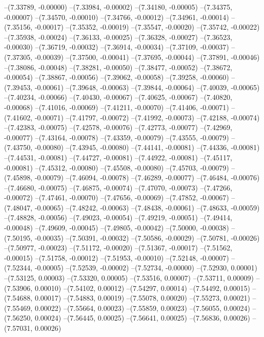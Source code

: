 --(7.33789, -0.00000)
--(7.33984, -0.00002)
--(7.34180, -0.00005)
--(7.34375, -0.00007)
--(7.34570, -0.00010)
--(7.34766, -0.00012)
--(7.34961, -0.00014)
--(7.35156, -0.00017)
--(7.35352, -0.00019)
--(7.35547, -0.00020)
--(7.35742, -0.00022)
--(7.35938, -0.00024)
--(7.36133, -0.00025)
--(7.36328, -0.00027)
--(7.36523, -0.00030)
--(7.36719, -0.00032)
--(7.36914, -0.00034)
--(7.37109, -0.00037)
--(7.37305, -0.00039)
--(7.37500, -0.00041)
--(7.37695, -0.00044)
--(7.37891, -0.00046)
--(7.38086, -0.00048)
--(7.38281, -0.00050)
--(7.38477, -0.00052)
--(7.38672, -0.00054)
--(7.38867, -0.00056)
--(7.39062, -0.00058)
--(7.39258, -0.00060)
--(7.39453, -0.00061)
--(7.39648, -0.00063)
--(7.39844, -0.00064)
--(7.40039, -0.00065)
--(7.40234, -0.00066)
--(7.40430, -0.00067)
--(7.40625, -0.00067)
--(7.40820, -0.00068)
--(7.41016, -0.00069)
--(7.41211, -0.00070)
--(7.41406, -0.00071)
--(7.41602, -0.00071)
--(7.41797, -0.00072)
--(7.41992, -0.00073)
--(7.42188, -0.00074)
--(7.42383, -0.00075)
--(7.42578, -0.00076)
--(7.42773, -0.00077)
--(7.42969, -0.00077)
--(7.43164, -0.00078)
--(7.43359, -0.00079)
--(7.43555, -0.00079)
--(7.43750, -0.00080)
--(7.43945, -0.00080)
--(7.44141, -0.00081)
--(7.44336, -0.00081)
--(7.44531, -0.00081)
--(7.44727, -0.00081)
--(7.44922, -0.00081)
--(7.45117, -0.00081)
--(7.45312, -0.00080)
--(7.45508, -0.00080)
--(7.45703, -0.00079)
--(7.45898, -0.00079)
--(7.46094, -0.00078)
--(7.46289, -0.00077)
--(7.46484, -0.00076)
--(7.46680, -0.00075)
--(7.46875, -0.00074)
--(7.47070, -0.00073)
--(7.47266, -0.00072)
--(7.47461, -0.00070)
--(7.47656, -0.00069)
--(7.47852, -0.00067)
--(7.48047, -0.00065)
--(7.48242, -0.00063)
--(7.48438, -0.00061)
--(7.48633, -0.00059)
--(7.48828, -0.00056)
--(7.49023, -0.00054)
--(7.49219, -0.00051)
--(7.49414, -0.00048)
--(7.49609, -0.00045)
--(7.49805, -0.00042)
--(7.50000, -0.00038)
--(7.50195, -0.00035)
--(7.50391, -0.00032)
--(7.50586, -0.00029)
--(7.50781, -0.00026)
--(7.50977, -0.00023)
--(7.51172, -0.00020)
--(7.51367, -0.00017)
--(7.51562, -0.00015)
--(7.51758, -0.00012)
--(7.51953, -0.00010)
--(7.52148, -0.00007)
--(7.52344, -0.00005)
--(7.52539, -0.00002)
--(7.52734, -0.00000)
--(7.52930, 0.00001)
--(7.53125, 0.00003)
--(7.53320, 0.00005)
--(7.53516, 0.00007)
--(7.53711, 0.00009)
--(7.53906, 0.00010)
--(7.54102, 0.00012)
--(7.54297, 0.00014)
--(7.54492, 0.00015)
--(7.54688, 0.00017)
--(7.54883, 0.00019)
--(7.55078, 0.00020)
--(7.55273, 0.00021)
--(7.55469, 0.00022)
--(7.55664, 0.00023)
--(7.55859, 0.00023)
--(7.56055, 0.00024)
--(7.56250, 0.00024)
--(7.56445, 0.00025)
--(7.56641, 0.00025)
--(7.56836, 0.00026)
--(7.57031, 0.00026)
